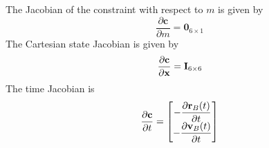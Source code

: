 %
The Jacobian of the constraint with respect to $m$ is given by
\begin{equation}
\frac{\partial \mathbf{c}}{\partial m} =
\mathbf{0}_{6 \times 1}
\end{equation}
%
The Cartesian state Jacobian is given by
\begin{equation}
\frac{\partial \mathbf{c}}{\partial \mathbf{x}} =
\mathbf{I}_{6 \times 6}
\end{equation}
%
The time Jacobian is
%
\begin{equation}
\frac{\partial \mathbf{c}}{\partial t} =
\begin{bmatrix}
   \displaystyle-\frac{\partial \mathbf{r}_B(t)}{\partial t} \\
   \displaystyle-\frac{\partial \mathbf{v}_B(t)}{\partial t} \\
\end{bmatrix}
\end{equation}
%

